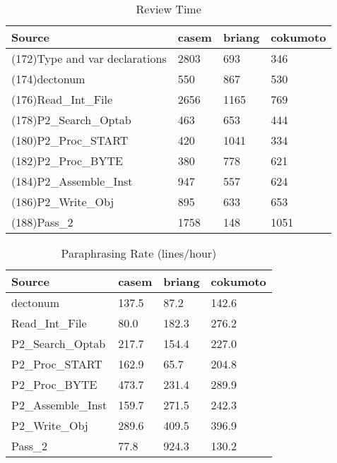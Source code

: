\begin{table}[hb]
\begin{center}
\begin{tabular}{|l|l|l|l|}
\hline
Source & casem & briang & cokumoto\\
\hline
(172)Type and var declarations & 2803 & 693 & 346\\
(174)dectonum & 550 & 867 & 530\\
(176)Read\_Int\_File & 2656 & 1165 & 769\\
(178)P2\_Search\_Optab & 463 & 653 & 444\\
(180)P2\_Proc\_START & 420 & 1041 & 334\\
(182)P2\_Proc\_BYTE & 380 & 778 & 621\\
(184)P2\_Assemble\_Inst & 947 & 557 & 624\\
(186)P2\_Write\_Obj & 895 & 633 & 653\\
(188)Pass\_2 & 1758 & 148 & 1051\\
\hline
\end{tabular}
\end{center}
\caption{Review Time}
\end{table}

\begin{table}[hb]
\begin{center}
\begin{tabular}{|l|l|l|l|}
\hline
Source & casem & briang & cokumoto\\
\hline
dectonum & 137.5 & 87.2 & 142.6\\
Read\_Int\_File & 80.0 & 182.3 & 276.2\\
P2\_Search\_Optab & 217.7 & 154.4 & 227.0\\
P2\_Proc\_START & 162.9 & 65.7 & 204.8\\
P2\_Proc\_BYTE & 473.7 & 231.4 & 289.9\\
P2\_Assemble\_Inst & 159.7 & 271.5 & 242.3\\
P2\_Write\_Obj & 289.6 & 409.5 & 396.9\\
Pass\_2 & 77.8 & 924.3 & 130.2\\
\hline
\end{tabular}
\end{center}
\caption{Paraphrasing Rate (lines/hour)}
\end{table}


